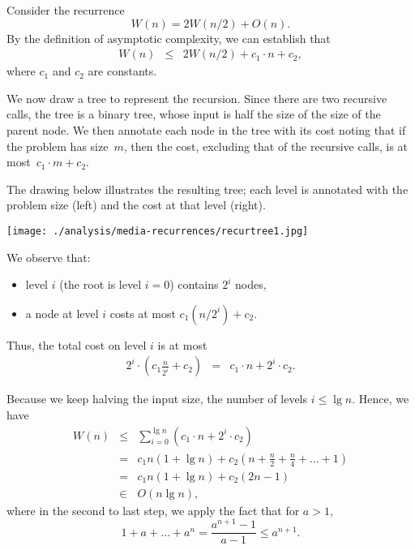 \begin{cluster}
\label{grp:xmpl:analysis::recurrences::consider}

\begin{example}
\label{xmpl:analysis::recurrences::consider}
Consider the recurrence
$$
W(n) = 2W(n/2) + O(n).
$$
By the definition of asymptotic complexity, we
can establish that
\begin{eqnarray*}
  W(n) &\leq& 2W(n/2) + c_1\cdot n + c_2,
\end{eqnarray*}
where $c_1$ and $c_2$ are constants.  

We now draw a tree to represent the recursion. Since there are two
recursive calls, the tree is a binary tree, whose input is half the
size of the size of the parent node.
We then annotate each node in the tree with its cost noting that if
the problem has size~$m$, then the cost, excluding that of the
recursive calls, is at most~$c_1 \cdot m + c_2$.  

The drawing below illustrates the resulting tree; each level is
annotated with the problem size (left) and the cost at that level
(right).

\begin{center}
\texttt{[image: ./analysis/media-recurrences/recurtree1.jpg]}
\end{center}

We observe that:
\begin{itemize}
\item  level $i$ (the root is level $i=0$) contains $2^i$
nodes, 
\item a node at level $i$ costs at most $c_1 (n/2^i) + c_2$.
\end{itemize}
Thus, the total cost on level $i$ is at most
\begin{eqnarray*}
2^i \cdot \left(c_1 \frac{n}{2^i} + c_2\right) &=& c_1 \cdot n + 2^i \cdot c_2.
\end{eqnarray*}

Because we keep halving the input size, the number of levels $i \le
\lg n$.  Hence, we have
\begin{eqnarray*}
  W(n) &\leq& \sum_{i=0}^{\lg n} \left(c_1 \cdot n + 2^i \cdot c_2\right) \\
  &=& c_1 n (1+\lg n)+ c_2(n +\tfrac{n}{2} + \tfrac{n}{4} + \dots + 1)\\
  &=& c_1 n (1+\lg n)+ c_2(2n - 1)\\
  &\in& O(n\lg n),
\end{eqnarray*}
where in the second to last step, we apply the fact that for $a > 1$,
\[ \begin{equation*}
1 + a + \dots + a^{n} = \frac{a^{n+1} - 1}{a-1} \leq a^{n+1}.
\end{equation*} \]

\end{example}
\end{cluster}


